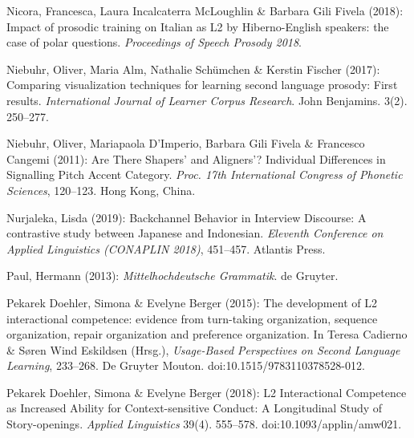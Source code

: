 \begin{styleBibliography}
Nicora, Francesca, Laura Incalcaterra McLoughlin \& Barbara Gili Fivela (2018): Impact of prosodic training on Italian as L2 by Hiberno-English speakers: the case of polar questions. \textit{Proceedings of Speech Prosody 2018}.
\end{styleBibliography}

\begin{styleBibliography}
Niebuhr, Oliver, Maria Alm, Nathalie Schümchen \& Kerstin Fischer (2017): Comparing visualization techniques for learning second language prosody: First results. \textit{International Journal of Learner Corpus Research}. John Benjamins. 3(2). 250–277.
\end{styleBibliography}

\begin{styleBibliography}
Niebuhr, Oliver, Mariapaola D’Imperio, Barbara Gili Fivela \& Francesco Cangemi (2011): Are There {\textasciigrave}Shapers’ and {\textasciigrave}Aligners’? Individual Differences in Signalling Pitch Accent Category. \textit{Proc. 17th International Congress of Phonetic Sciences}, 120–123. Hong Kong, China.
\end{styleBibliography}

\begin{styleBibliography}
Nurjaleka, Lisda (2019): Backchannel Behavior in Interview Discourse: A contrastive study between Japanese and Indonesian. \textit{Eleventh Conference on Applied Linguistics (CONAPLIN 2018)}, 451–457. Atlantis Press.
\end{styleBibliography}

\begin{styleBibliography}
Paul, Hermann (2013): \textit{Mittelhochdeutsche Grammatik}. de Gruyter.
\end{styleBibliography}

\begin{styleBibliography}
Pekarek Doehler, Simona \& Evelyne Berger (2015): The development of L2 interactional competence: evidence from turn-taking organization, sequence organization, repair organization and preference organization. In Teresa Cadierno \& Søren Wind Eskildsen (Hrsg.), \textit{Usage-Based Perspectives on Second Language Learning}, 233–268. De Gruyter Mouton. doi:10.1515/9783110378528-012.
\end{styleBibliography}

\begin{styleBibliography}
Pekarek Doehler, Simona \& Evelyne Berger (2018): L2 Interactional Competence as Increased Ability for Context-sensitive Conduct: A Longitudinal Study of Story-openings. \textit{Applied Linguistics} 39(4). 555–578. doi:10.1093/applin/amw021.
\end{styleBibliography}


